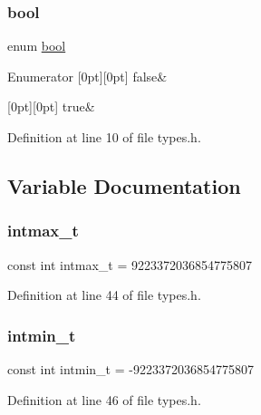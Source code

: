 \subsubsection{\texorpdfstring{bool}{bool}}
{\footnotesize\ttfamily enum \hyperlink{a00038_af6a258d8f3ee5206d682d799316314b1_af6a258d8f3ee5206d682d799316314b1}{bool}}

\begin{DoxyEnumFields}{Enumerator}
[0pt][0pt]{}\mbox{\label{a00038_af6a258d8f3ee5206d682d799316314b1_af6a258d8f3ee5206d682d799316314b1ae9de385ef6fe9bf3360d1038396b884c}} 
false&\\
\hline

[0pt][0pt]{}\mbox{\label{a00038_af6a258d8f3ee5206d682d799316314b1_af6a258d8f3ee5206d682d799316314b1a08f175a5505a10b9ed657defeb050e4b}} 
true&\\
\hline

\end{DoxyEnumFields}


Definition at line 10 of file types.\+h.



\subsection{Variable Documentation}
\mbox{\label{a00038_a22a331617ae96c4a5ccf0b9c551f4a38_a22a331617ae96c4a5ccf0b9c551f4a38}} 
\subsubsection{\texorpdfstring{intmax\+\_\+t}{intmax\_t}}
{\footnotesize\ttfamily const int intmax\+\_\+t = 9223372036854775807}



Definition at line 44 of file types.\+h.

\mbox{\label{a00038_a345eb85d099c85b858e47ea4ca7410f8_a345eb85d099c85b858e47ea4ca7410f8}} 
\subsubsection{\texorpdfstring{intmin\+\_\+t}{intmin\_t}}
{\footnotesize\ttfamily const int intmin\+\_\+t = -\/9223372036854775807}



Definition at line 46 of file types.\+h.


